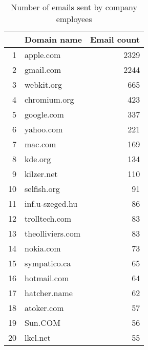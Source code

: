 \begin{table}[!htpb]
\begin{center}
\begin{tabular}{rlr}
  \hline
 & Domain name & Email count \\ 
  \hline
1 & apple.com & 2329 \\ 
  2 & gmail.com & 2244 \\ 
  3 & webkit.org & 665 \\ 
  4 & chromium.org & 423 \\ 
  5 & google.com & 337 \\ 
  6 & yahoo.com & 221 \\ 
  7 & mac.com & 169 \\ 
  8 & kde.org & 134 \\ 
  9 & kilzer.net & 110 \\ 
  10 & selfish.org &  91 \\ 
  11 & inf.u-szeged.hu &  86 \\ 
  12 & trolltech.com &  83 \\ 
  13 & theolliviers.com &  83 \\ 
  14 & nokia.com &  73 \\ 
  15 & sympatico.ca &  65 \\ 
  16 & hotmail.com &  64 \\ 
  17 & hatcher.name &  62 \\ 
  18 & atoker.com &  57 \\ 
  19 & Sun.COM &  56 \\ 
  20 & lkcl.net &  55 \\ 
   \hline
\end{tabular}
\caption{Number of emails sent by company employees}
\label{emails:company}
\end{center}
\end{table}
